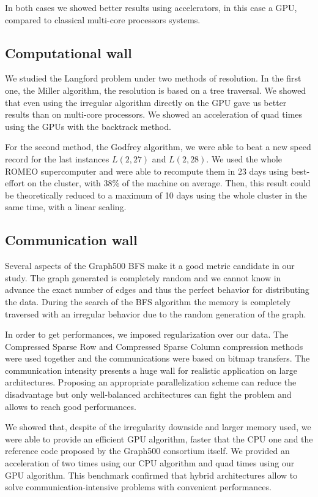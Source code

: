 In both cases we showed better results using accelerators, in this case a GPU, compared to classical multi-core processors systems. 

\subsection{Computational wall}
We studied the Langford problem under two methods of resolution. 
In the first one, the Miller algorithm, the resolution is based on a tree traversal. 
We showed that even using the irregular algorithm directly on the GPU gave us better results than on multi-core processors. 
We showed an acceleration of quad times using the GPUs with the backtrack method.

For the second method, the Godfrey algorithm, we were able to beat a new speed record for the last instances $L(2,27)$ and $L(2,28)$.
We used the whole ROMEO supercomputer and were able to recompute them in 23 days using best-effort on the cluster, with 38\% of the machine on average.
Then, this result could be theoretically reduced to a maximum of 10 days using the whole cluster in the same time, with a linear scaling. 

\subsection{Communication wall}
Several aspects of the Graph500 BFS make it a good metric candidate in our study. 
The graph generated is completely random and we cannot know in advance the exact number of edges and thus the perfect behavior for distributing the data. 
During the search of the BFS algorithm the memory is completely traversed with an irregular behavior due to the random generation of the graph. 

In order to get performances, we imposed regularization over our data.
The Compressed Sparse Row and Compressed Sparse Column compression methods were used together and the communications were based on bitmap transfers. 
The communication intensity presents a huge wall for realistic application on large architectures. 
Proposing an appropriate parallelization scheme can reduce the disadvantage but only well-balanced architectures can fight the problem and allows to reach good performances. 

We showed that, despite of the irregularity downside and larger memory used, we were able to provide an efficient GPU algorithm, faster that the CPU one and the reference code proposed by the Graph500 consortium itself.
We provided an acceleration of two times using our CPU algorithm and quad times using our GPU algorithm.
This benchmark confirmed that hybrid architectures allow to solve communication-intensive problems with convenient performances.\\

